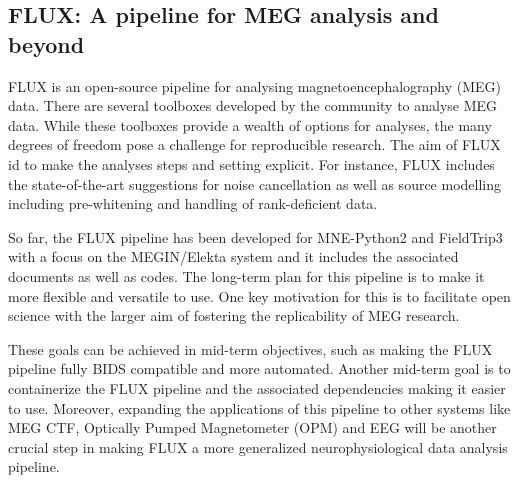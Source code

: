\documentclass[../main.tex]{subfiles}
\begin{document}
\subsection{FLUX: A pipeline for MEG analysis and beyond}

%

FLUX \parencite{} is an open-source pipeline for analysing magnetoencephalography (MEG) data. There are several toolboxes developed by the community to analyse MEG data. While these toolboxes provide a wealth of options for analyses, the many degrees of freedom pose a challenge for reproducible research. The aim of FLUX id to make the analyses steps and setting explicit. For instance, FLUX includes the state-of-the-art suggestions for noise cancellation as well as source modelling including pre-whitening and handling of rank-deficient data.

So far, the FLUX pipeline has been developed for MNE-Python2 \parencite{} and FieldTrip3 \parencite{} with a focus on the MEGIN/Elekta system and it includes the associated documents as well as codes.
The long-term plan for this pipeline is to make it more flexible and versatile to use. One key motivation for this is to facilitate open science with the larger aim of fostering the replicability of MEG research.

These goals can be achieved in mid-term objectives, such as making the FLUX pipeline fully BIDS compatible and more automated. Another mid-term goal is to containerize the FLUX pipeline and the associated dependencies making it easier to use. Moreover, expanding the applications of this pipeline to other systems like MEG CTF, Optically Pumped Magnetometer (OPM) and EEG will be another crucial step in making FLUX a more generalized neurophysiological data analysis pipeline.
\end{document}
